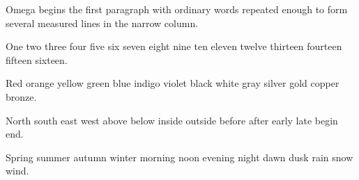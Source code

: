 
\hsize=220pt \vsize=240pt
Omega begins the first paragraph with ordinary words repeated enough to form several measured lines in the narrow column.

One two three four five six seven eight nine ten eleven twelve thirteen fourteen fifteen sixteen.

Red orange yellow green blue indigo violet black white gray silver gold copper bronze.

North south east west above below inside outside before after early late begin end.

Spring summer autumn winter morning noon evening night dawn dusk rain snow wind.
\bye
